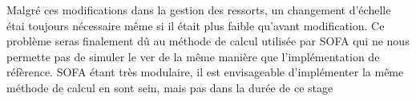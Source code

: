 Malgré ces modifications dans la gestion des ressorts, un changement d'échelle
étai toujours nécessaire même si il était plus faible qu'avant modification.
Ce problème seras finalement dû au méthode de calcul utilisée par SOFA qui ne
nous permette pas de simuler le ver de la même manière que l'implémentation de
réfèrence. SOFA étant très modulaire, il est envisageable d'implémenter la même
méthode de calcul en sont sein, mais pas dans la durée de ce stage




